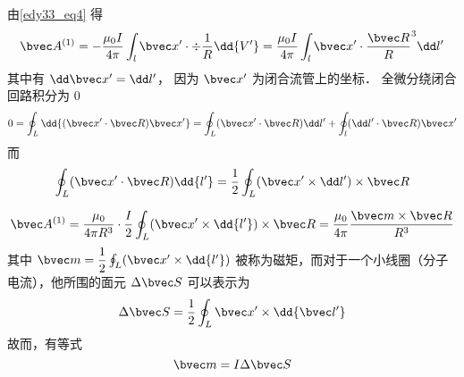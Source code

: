 由\autoref{edy33_eq4} 得
\begin{equation}
\bvec A^{(1)}=-\dfrac{\mu_0 I }{4\pi}\int_l \bvec x^{\prime}\cdot\div\dfrac1 R\dd{V^{\prime}}=\dfrac{\mu_0 I }{4\pi}\int_l \bvec x^{\prime}\cdot\dfrac{\bvec R}R^3\dd l^{\prime}\label{edy33_eq7}
\end{equation}
其中有 $\dd \bvec x^{\prime}=\dd l^{\prime}$， 因为 $ \bvec x^{\prime}$ 为闭合流管上的坐标．
全微分绕闭合回路积分为 $0$
\begin{equation}
0=\oint_L \dd{(\bvec x^{\prime}\cdot \bvec R)\bvec x^{\prime}}=\oint_L (\bvec x^{\prime}\cdot\bvec R)\dd l^{\prime}+\oint_l (\dd l^{\prime}\cdot \bvec R)\bvec x^{\prime}\label{edy33_eq8}
\end{equation}
而
\begin{equation}
\oint_L (\bvec x^{\prime}\cdot \bvec R)\dd{l^{\prime}}=\dfrac1 2\oint_L (\bvec x^{\prime}\times \dd l^{\prime})\times \bvec R \label{edy33_eq9}
\end{equation}

\begin{equation}
\bvec A^{(1)}=\dfrac{\mu_0}{4\pi R^3}\cdot\dfrac{I}{2}\oint_L (\bvec x^{\prime}\times \dd{l^{\prime}})\times \bvec R=\dfrac{\mu_0}{4\pi}\dfrac{\bvec m \times \bvec R}{R^3}\label{edy33_eq10}
\end{equation}
其中 $\bvec m =\dfrac{1}{2}\oint_L (\bvec x^{\prime}\times \dd{l^{\prime}})$ 被称为磁矩，而对于一个小线圈（分子电流），他所围的面元 $\Delta\bvec S$ 可以表示为
\begin{equation}
\Delta\bvec S=\dfrac 1 2\oint_L \bvec x^{\prime}\times \dd{\bvec l^{\prime}}
\end{equation}
故而，有等式
\begin{equation}
\bvec m=I\Delta \bvec S
\end{equation}
